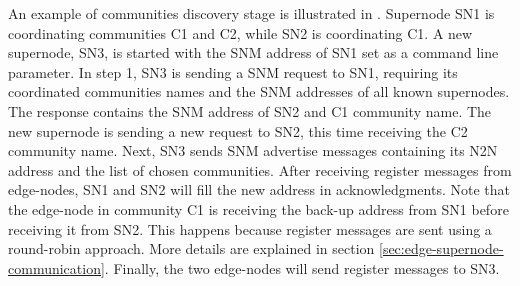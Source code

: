 An example of communities discovery stage is illustrated in . Supernode SN1 is coordinating communities C1 and C2, while SN2 is coordinating C1. A new supernode, SN3, is started with the SNM address of SN1 set as a command line parameter.  
In step 1, SN3 is sending a SNM request to SN1, requiring its coordinated communities names and the SNM addresses of all known supernodes. The response contains the SNM address of SN2 and C1 community name. The new supernode is sending a new request to SN2, this time receiving the C2 community name. Next, SN3 sends SNM advertise messages containing its N2N address and the list of chosen communities. After receiving register messages from edge-nodes, SN1 and SN2 will fill the new address in acknowledgments. Note that the edge-node in community C1 is receiving the back-up address from SN1 before receiving it from SN2. This happens because register messages are sent using a round-robin approach. More details are explained in section \ref{sec:edge-supernode-communication}. Finally, the two edge-nodes will send register messages to SN3.